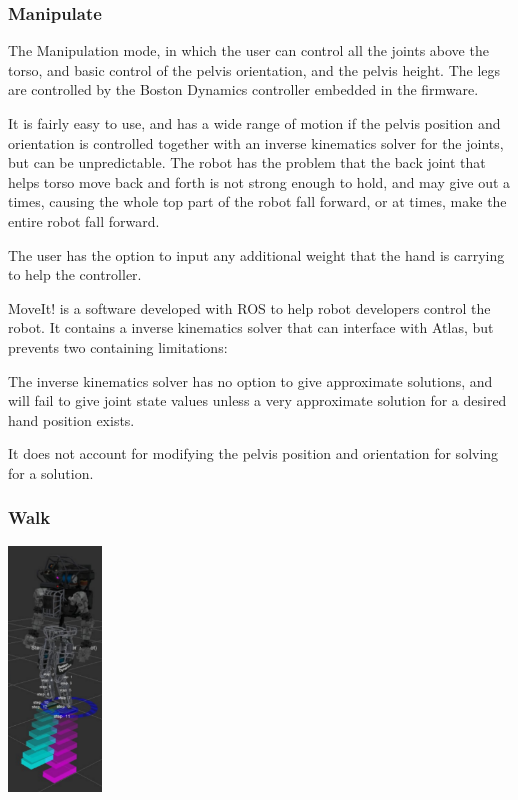 \documentclass{article}
\begin{document}
\subsubsection{Manipulate}
The Manipulation mode, in which the user can control all the joints above the torso, and basic control of the pelvis orientation, and the pelvis height. The legs are controlled by the Boston Dynamics controller embedded in the firmware.

It is fairly easy to use, and has a wide range of motion if the pelvis position and orientation is controlled together with an inverse kinematics solver for the joints, but can be unpredictable. The robot has the problem that the back joint that helps torso move back and forth is not strong enough to hold, and may give out a times, causing the whole top part of the robot fall forward, or at times, make the entire robot fall forward. 

The user has the option to input any additional weight that the hand is carrying to help the controller.

MoveIt! is a software developed with ROS to help robot developers control the robot. It contains a inverse kinematics solver that can interface with Atlas, but prevents two containing limitations: 
\begin{inparaenum}
\item The inverse kinematics solver has no option to give approximate solutions, and will fail to give joint state values unless a very approximate solution for a desired hand position exists.
\item It does not account for modifying the pelvis position and orientation for solving for a solution. \end{inparaenum}
 

\subsubsection{Walk}
\includegraphics[width=2.5cm]{images/step_gui.png}
\end{document}
